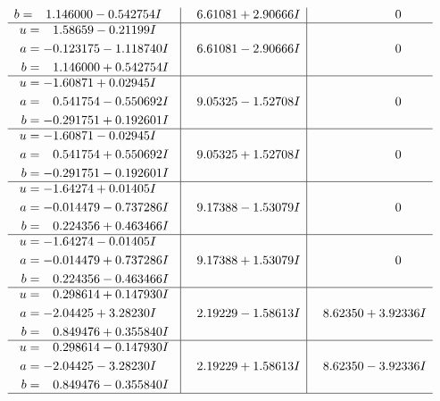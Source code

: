 \documentclass[1p]{elsarticle_modified}
\theoremstyle{definition}
\begin{document}
$$\begin{array}{c|c|c}
\begin{aligned}
b &= \phantom{-}1.146000 - 0.542754 I\end{aligned}
 & \phantom{-}6.61081 + 2.90666 I & \phantom{-0.000000 } 0 \\ \hline\begin{aligned}
u &= \phantom{-}1.58659 - 0.21199 I \\
a &= -0.123175 - 1.118740 I \\
b &= \phantom{-}1.146000 + 0.542754 I\end{aligned}
 & \phantom{-}6.61081 - 2.90666 I & \phantom{-0.000000 } 0 \\ \hline\begin{aligned}
u &= -1.60871 + 0.02945 I \\
a &= \phantom{-}0.541754 - 0.550692 I \\
b &= -0.291751 + 0.192601 I\end{aligned}
 & \phantom{-}9.05325 - 1.52708 I & \phantom{-0.000000 } 0 \\ \hline\begin{aligned}
u &= -1.60871 - 0.02945 I \\
a &= \phantom{-}0.541754 + 0.550692 I \\
b &= -0.291751 - 0.192601 I\end{aligned}
 & \phantom{-}9.05325 + 1.52708 I & \phantom{-0.000000 } 0 \\ \hline\begin{aligned}
u &= -1.64274 + 0.01405 I \\
a &= -0.014479 - 0.737286 I \\
b &= \phantom{-}0.224356 + 0.463466 I\end{aligned}
 & \phantom{-}9.17388 - 1.53079 I & \phantom{-0.000000 } 0 \\ \hline\begin{aligned}
u &= -1.64274 - 0.01405 I \\
a &= -0.014479 + 0.737286 I \\
b &= \phantom{-}0.224356 - 0.463466 I\end{aligned}
 & \phantom{-}9.17388 + 1.53079 I & \phantom{-0.000000 } 0 \\ \hline\begin{aligned}
u &= \phantom{-}0.298614 + 0.147930 I \\
a &= -2.04425 + 3.28230 I \\
b &= \phantom{-}0.849476 + 0.355840 I\end{aligned}
 & \phantom{-}2.19229 - 1.58613 I & \phantom{-}8.62350 + 3.92336 I \\ \hline\begin{aligned}
u &= \phantom{-}0.298614 - 0.147930 I \\
a &= -2.04425 - 3.28230 I \\
b &= \phantom{-}0.849476 - 0.355840 I\end{aligned}
 & \phantom{-}2.19229 + 1.58613 I & \phantom{-}8.62350 - 3.92336 I\\
 \hline 
 \end{array}$$\newpage\newpage\renewcommand{\arraystretch}{1}
\end{document}
